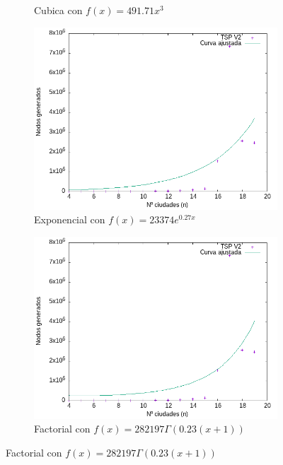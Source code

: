 \documentclass{article}
\begin{document}
\begin{figure}[H]
\begin{subfigure}[b]{0.45\textwidth}
        \caption{Cubica con $f(x)=491.71x^3$}
    \end{subfigure}
    \begin{subfigure}[b]{0.45\textwidth}
        \centering
        \includegraphics[width=\textwidth]{Sucio_Olga/Data/CurvaAjustadaExponencial.png}
        \caption{Exponencial con $f(x)=23374 e^{0.27x}$}
    \end{subfigure}
    \begin{subfigure}[b]{0.45\textwidth}
        \centering
        \includegraphics[width=\textwidth]{Sucio_Olga/Data/CurvaAjustadaFactorial.png}
        \caption{Factorial con $f(x)=282197\Gamma(0.23(x+1))$}
    \end{subfigure}
\end{figure}
\end{document}
